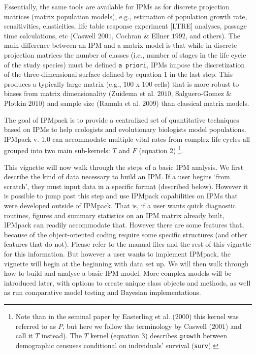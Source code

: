 \documentclass{article}
\begin{document}
Essentially, the same tools are available for IPMs as for discrete projection matrices (matrix population models), e.g., estimation of population growth rate, sensitivities, elasticities, life table response experiment [LTRE] analyses, passage time calculations, etc (Caswell $2001$, Cochran \& Ellner $1992$, and others). The main difference between an IPM and a matrix model is that while in discrete projection matrices the number of classes (i.e., number of stages in the life cycle of the study species) must be defined {\tt a priori}, IPMs impose the discretization of the three-dimensional surface defined by equation 1 in the last step. This produces a typically large matrix (e.g., $100$ x $100$ cells) that is more robust to biases from matrix dimensionality (Zuidema et al. $2010$, Salguero-Gomez \& Plotkin $2010$) and sample size (Ramula et al. $2009$) than classical matrix models.  

The goal of IPMpack is to provide a centralized set of quantitative techniques based on IPMs to help ecologists and evolutionary biologists model populations. IPMpack v. 1.0 can accommodate multiple vital rates from complex life cycles all grouped into two main sub-kernels: $T$ and $F$ (equation 2) \footnote{Note than in the seminal paper by Easterling et al. ($2000$) this kernel was referred to as $P$, but here we follow the terminology by Caswell ($2001$) and call it $T$ instead). The $T$ kernel (equation 3) describes {\tt growth} between demographic censuses conditional on individuals' survival ({\tt surv}).
}.

This vignette will now walk through the steps of a basic IPM analysis.  We first describe the kind of data necessary to build an IPM.  If a user begins `from scratch', they must input data in a specific format (described below).  However it is possible to jump past this step and use IPMpack capabilities on IPMs that were developed outside of IPMpack.  That is, if a user wants quick diagnostic routines, figures and summary statistics on an IPM matrix already built, IPMpack can readily accommodate that.   However there are some features that, because of the object-oriented coding require some specific structures (and other features that do not).  Please refer to the manual files and the rest of this vignette for this information.  But however a user wants to implement IPMpack, the vignette will begin at the beginning with data set up.  We will then walk through how to build and analyse a basic IPM model.  More complex models will be introduced later, with options to create unique class objects and methods, as well as run comparative model testing and Bayesian implementations.
\end{document}
